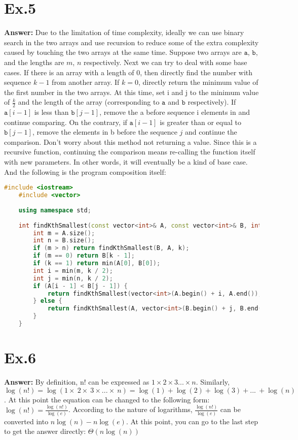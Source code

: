 \documentclass{article}
\begin{document}
\section*{Ex.5}
    \textbf{Answer:} Due to the limitation of time complexity, ideally we can use binary search in the two arrays and use recursion to reduce some of the extra complexity caused by touching the two arrays at the same time. Suppose two arrays are $\texttt{a}$, $\texttt{b}$, and the lengths are $m$, $n$ respectively. Next we can try to deal with some base cases. If there is an array with a length of 0, then directly find the number with sequence $k-1$ from another array. If $k=0$, directly return the minimum value of the first number in the two arrays. At this time, set i and j to the minimum value of $\frac{k}{2}$ and the length of the array (corresponding to $\texttt{a}$ and $\texttt{b}$ respectively). If $\texttt{a}\left[i-1\right]$ is less than $\texttt{b}\left[j-1\right]$, remove the a before sequence i elements in and continue comparing. On the contrary, if $\texttt{a}\left[i-1\right]$ is greater than or equal to $\texttt{b}\left[j-1\right]$, remove the elements in b before the sequence $j$ and continue the comparison. Don't worry about this method not returning a value. Since this is a recursive function, continuing the comparison means re-calling the function itself with new parameters. In other words, it will eventually be a kind of base case. And the following is the program composition itself:
    \begin{lstlisting}[language=C++]
    #include <iostream>
    #include <vector>
    
    using namespace std;
    
    int findKthSmallest(const vector<int>& A, const vector<int>& B, int k) {
        int m = A.size();
        int n = B.size();
        if (m > n) return findKthSmallest(B, A, k);
        if (m == 0) return B[k - 1];
        if (k == 1) return min(A[0], B[0]);
        int i = min(m, k / 2);
        int j = min(n, k / 2);
        if (A[i - 1] < B[j - 1]) {
            return findKthSmallest(vector<int>(A.begin() + i, A.end()), B, k - i);
        } else {
            return findKthSmallest(A, vector<int>(B.begin() + j, B.end()), k - j);
        }
    }
    \end{lstlisting}
\section*{Ex.6}
    \textbf{Answer:} By definition, n! can be expressed as $1\times 2\times 3...\times n$. Similarly, $\log \left(n!\right)=\log \left(1\times \:2\times \:3\times ...\times \:n\right)=\log \left( 1\right)+\log \left(2\right)+\log \left(3\right)+...\:+\log \left(n\right)$. At this point the equation can be changed to the following form: $\log \left(n!\right)=\frac{\log \left(n!\right)}{\log \left(e\right)}$. According to the nature of logarithms, $\frac{\log \left(n!\right)}{\log \left(e\right)}$ can be converted into $n\log \left(n\right)-n \log \left(e\right)$. At this point, you can go to the last step to get the answer directly: $\Theta\left(n\log \left(n\right)\right)$
\end{document}
